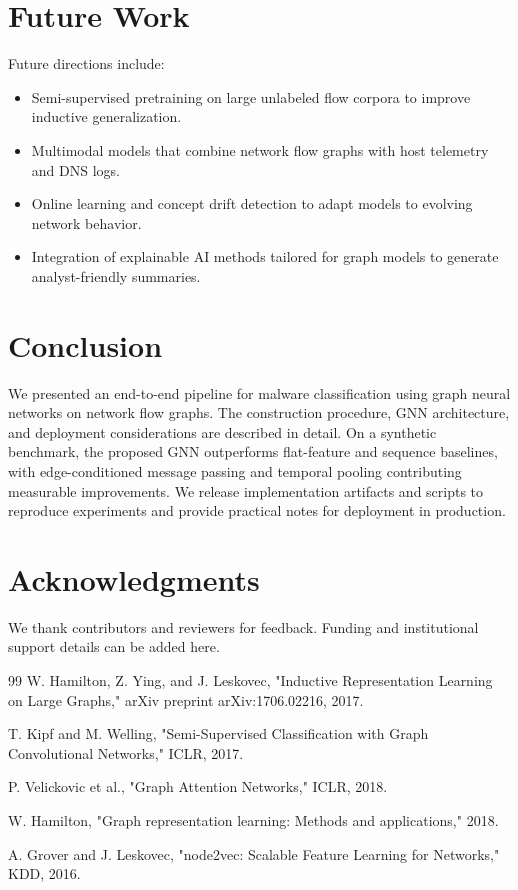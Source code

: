 \documentclass[conference]{IEEEtran}
\begin{document}
\section{Future Work}

Future directions include:

\begin{itemize}
  \item Semi-supervised pretraining on large unlabeled flow corpora to improve inductive generalization.
  \item Multimodal models that combine network flow graphs with host telemetry and DNS logs.
  \item Online learning and concept drift detection to adapt models to evolving network behavior.
  \item Integration of explainable AI methods tailored for graph models to generate analyst-friendly summaries.
\end{itemize}

\section{Conclusion}

We presented an end-to-end pipeline for malware classification using graph neural networks on network flow graphs. The construction procedure, GNN architecture, and deployment considerations are described in detail. On a synthetic benchmark, the proposed GNN outperforms flat-feature and sequence baselines, with edge-conditioned message passing and temporal pooling contributing measurable improvements. We release implementation artifacts and scripts to reproduce experiments and provide practical notes for deployment in production.

\section*{Acknowledgments}

We thank contributors and reviewers for feedback. Funding and institutional support details can be added here.

\begin{thebibliography}{99}
W. Hamilton, Z. Ying, and J. Leskovec, "Inductive Representation Learning on Large Graphs," arXiv preprint arXiv:1706.02216, 2017.

T. Kipf and M. Welling, "Semi-Supervised Classification with Graph Convolutional Networks," ICLR, 2017.

P. Velickovic et al., "Graph Attention Networks," ICLR, 2018.

W. Hamilton, "Graph representation learning: Methods and applications," 2018.

A. Grover and J. Leskovec, "node2vec: Scalable Feature Learning for Networks," KDD, 2016.

\end{thebibliography}
\end{document}
